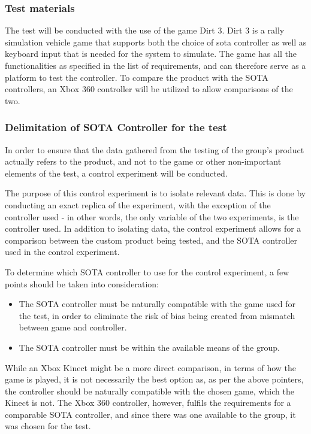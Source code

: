 \subsubsection{Test materials}
The test will be conducted with the use of the game Dirt 3. 
Dirt 3 is a rally simulation vehicle game that supports both the choice of sota controller as well as keyboard input that is needed for the system to simulate.  
The game has all the functionalities as specified in the list of requirements, and can therefore serve as a platform to test the controller.
To compare the product with the SOTA controllers, an Xbox 360 controller will be utilized to allow comparisons of the two.


\subsubsection{Delimitation of SOTA Controller for the test}
In order to ensure that the data gathered from the testing of the group's product actually refers to the product, and not to the game or other non-important elements of the test, a control experiment will be conducted.

The purpose of this control experiment is to isolate relevant data. 
This is done by conducting an exact replica of the experiment, with the exception of the controller used - in other words, the only variable of the two experiments, is the controller used. 
In addition to isolating data, the control experiment allows for a comparison between the custom product being tested, and the SOTA controller used in the control experiment.
\bigskip

To determine which SOTA controller to use for the control experiment, a few points should be taken into consideration:
\begin{itemize}
\item The SOTA controller must be naturally compatible with the game used for the test, in order to eliminate the risk of bias being created from mismatch between game and controller.

\item The SOTA controller must be within the available means of the group.
\end{itemize}

While an Xbox Kinect might be a more direct comparison, in terms of how the game is played, it is not necessarily the best option as, as per the above pointers, the controller should be naturally compatible with the chosen game, which the Kinect is not. 
The Xbox 360 controller, however, fulfils the requirements for a comparable SOTA controller, and since there was one available to the group, it was chosen for the test.

